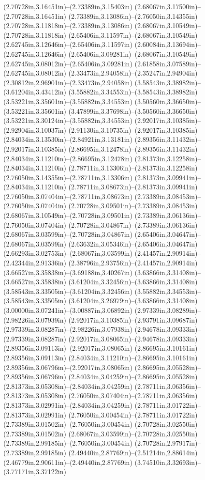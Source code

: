 (2.70728in,3.16451in)--(2.73389in,3.15403in) (2.68067in,3.17500in)--(2.70728in,3.16451in) (2.73389in,3.13086in)--(2.76050in,3.14355in) (2.70728in,3.11818in)--(2.73389in,3.13086in) (2.68067in,3.10549in)--(2.70728in,3.11818in) (2.65406in,3.11597in)--(2.68067in,3.10549in) (2.62745in,3.12646in)--(2.65406in,3.11597in) (2.60084in,3.13694in)--(2.62745in,3.12646in) (2.65406in,3.09281in)--(2.68067in,3.10549in) (2.62745in,3.08012in)--(2.65406in,3.09281in) (2.61858in,3.07589in)--(2.62745in,3.08012in) (2.33473in,2.94058in)--(2.35247in,2.94904in) (2.30812in,2.96901in)--(2.33473in,2.94058in) (3.58543in,3.38982in)--(3.61204in,3.43412in) (3.55882in,3.34553in)--(3.58543in,3.38982in) (3.53221in,3.35601in)--(3.55882in,3.34553in) (3.50560in,3.36650in)--(3.53221in,3.35601in) (3.47899in,3.37698in)--(3.50560in,3.36650in) (3.53221in,3.30124in)--(3.55882in,3.34553in) (2.92017in,3.10385in)--(2.92904in,3.10037in) (2.91130in,3.10735in)--(2.92017in,3.10385in) (2.84034in,3.13530in)--(2.84921in,3.13181in) (2.89356in,3.11432in)--(2.92017in,3.10385in) (2.86695in,3.12478in)--(2.89356in,3.11432in) (2.84034in,3.11210in)--(2.86695in,3.12478in) (2.81373in,3.12258in)--(2.84034in,3.11210in) (2.78711in,3.13306in)--(2.81373in,3.12258in) (2.76050in,3.14355in)--(2.78711in,3.13306in) (2.81373in,3.09941in)--(2.84034in,3.11210in) (2.78711in,3.08673in)--(2.81373in,3.09941in) (2.76050in,3.07404in)--(2.78711in,3.08673in) (2.73389in,3.08453in)--(2.76050in,3.07404in) (2.70728in,3.09501in)--(2.73389in,3.08453in) (2.68067in,3.10549in)--(2.70728in,3.09501in) (2.73389in,3.06136in)--(2.76050in,3.07404in) (2.70728in,3.04867in)--(2.73389in,3.06136in) (2.68067in,3.03599in)--(2.70728in,3.04867in) (2.65406in,3.04647in)--(2.68067in,3.03599in) (2.63632in,3.05346in)--(2.65406in,3.04647in) (2.66293in,3.02753in)--(2.68067in,3.03599in) (2.41457in,2.90914in)--(2.42344in,2.91336in) (2.38796in,2.93756in)--(2.41457in,2.90914in) (3.66527in,3.35838in)--(3.69188in,3.40267in) (3.63866in,3.31408in)--(3.66527in,3.35838in) (3.61204in,3.32456in)--(3.63866in,3.31408in) (3.58543in,3.33505in)--(3.61204in,3.32456in) (3.55882in,3.34553in)--(3.58543in,3.33505in) (3.61204in,3.26979in)--(3.63866in,3.31408in) (3.00000in,3.07241in)--(3.00887in,3.06892in) (2.97339in,3.08289in)--(2.98226in,3.07939in) (2.92017in,3.10385in)--(2.93791in,3.09687in) (2.97339in,3.08287in)--(2.98226in,3.07938in) (2.94678in,3.09333in)--(2.97339in,3.08287in) (2.92017in,3.08065in)--(2.94678in,3.09333in) (2.89356in,3.09113in)--(2.92017in,3.08065in) (2.86695in,3.10161in)--(2.89356in,3.09113in) (2.84034in,3.11210in)--(2.86695in,3.10161in) (2.89356in,3.06796in)--(2.92017in,3.08065in) (2.86695in,3.05528in)--(2.89356in,3.06796in) (2.84034in,3.04259in)--(2.86695in,3.05528in) (2.81373in,3.05308in)--(2.84034in,3.04259in) (2.78711in,3.06356in)--(2.81373in,3.05308in) (2.76050in,3.07404in)--(2.78711in,3.06356in) (2.81373in,3.02991in)--(2.84034in,3.04259in) (2.78711in,3.01722in)--(2.81373in,3.02991in) (2.76050in,3.00454in)--(2.78711in,3.01722in) (2.73389in,3.01502in)--(2.76050in,3.00454in) (2.70728in,3.02550in)--(2.73389in,3.01502in) (2.68067in,3.03599in)--(2.70728in,3.02550in) (2.73389in,2.99185in)--(2.76050in,3.00454in) (2.70728in,2.97917in)--(2.73389in,2.99185in) (2.49440in,2.87769in)--(2.51214in,2.88614in) (2.46779in,2.90611in)--(2.49440in,2.87769in) (3.74510in,3.32693in)--(3.77171in,3.37122in) 